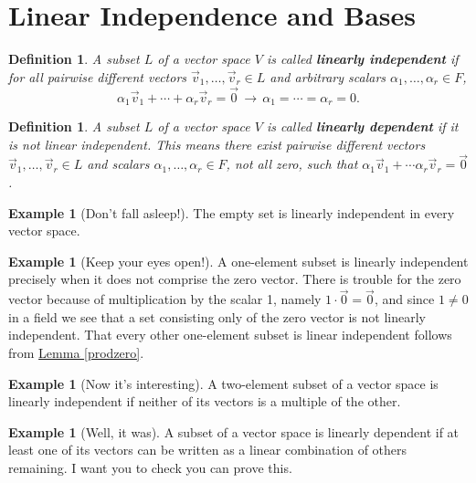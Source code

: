 \documentclass[11pt]{amsbook}
\newtheorem{definition}[theorem]{Definition}
\theoremstyle{definition}
\newtheorem{ex}[theorem]{Example}
\begin{document}
\section{Linear Independence and Bases}

\begin{definition} A subset $L$ of a vector space $V$ is called {\bf linearly independent} if for all pairwise different vectors $\vec{v}_1, \ldots , \vec{v}_r \in L$ and arbitrary scalars $\alpha_1, \ldots , \alpha_r\in F$, $$\alpha_1  \vec{v}_1 + \cdots + \alpha_r \vec{v}_r = \vec{0} \, \to \, \alpha_1 = \cdots = \alpha_r = 0.$$
\end{definition}

\begin{definition} A subset $L$ of a vector space $V$ is called {\bf linearly dependent} if it is not linear independent. This means there exist pairwise different vectors $\vec{v}_1, \ldots , \vec{v}_r \in L$ and scalars $\alpha_1, \ldots , \alpha_r\in F$, not all zero, such that $\alpha_1  \vec{v}_1 + \cdots \alpha_r \vec{v}_r = \vec{0}$.
\end{definition}

\begin{ex}[Don't fall asleep!] The empty set is linearly independent in every vector space.\end{ex}

\begin{ex}[Keep your eyes open!] A one-element subset is linearly independent precisely when it does not comprise the zero vector. There is trouble for the zero vector because of multiplication by the scalar 1, namely $1\cdot  \vec{0} =  \vec{0}$, and since $1\neq 0$ in a field we see that a set consisting only of the zero vector is not linearly independent. That every other one-element subset is linear independent follows from \hyperref[prodzero]{Lemma \ref{prodzero}}. \end{ex}

\begin{ex}[Now it's interesting] A two-element subset of a vector space is linearly independent if neither of its vectors is a multiple of the other.
\end{ex}

\begin{ex}[Well, it was] A subset of a vector space is linearly dependent if at least one of its vectors can be written as a linear combination of others remaining. I want you to check you can prove this. \end{ex}
\end{document}
